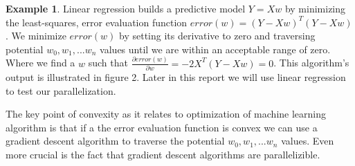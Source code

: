 \documentclass{article}
\theoremstyle{definition}
\newtheorem{example}{Example}[section]
\begin{document}
\begin{example}
    Linear regression builds a predictive model $Y = Xw$ by minimizing the least-squares, error evaluation function $error(w) = (Y - Xw)^T(Y - Xw)$. We minimize $error(w)$ by setting its derivative to zero and traversing potential $w_0, w_1, ... w_n$ values until we are within an acceptable range of zero. Where we find a $w$ such that $\frac{\partial error(w)}{\partial w} = -2X^T(Y - Xw) = 0$. This algorithm's output is illustrated in figure 2. Later in this report we will use linear regression to test our parallelization.
\end{example}

The key point of convexity as it relates to optimization of machine learning algorithm is that if a the error evaluation function is convex we can use a gradient descent algorithm to traverse the potential $w_0, w_1, ... w_n$ values. Even more crucial is the fact that gradient descent algorithms are parallelizible.
\end{document}

